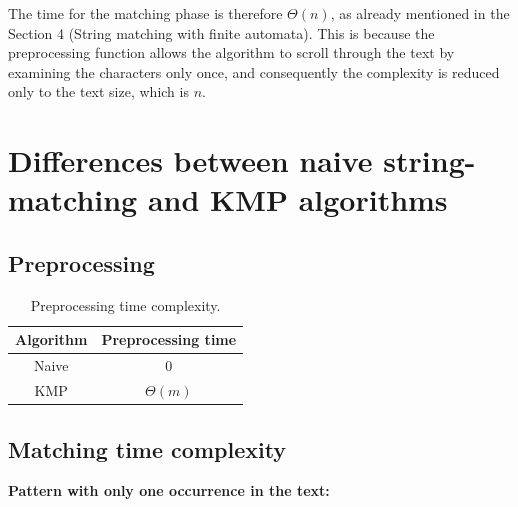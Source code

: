 \documentclass[11pt]{article}
\begin{document}
            The time for the matching phase is therefore $\Theta(n)$, as already mentioned in the Section 4 (String matching with finite automata).
            This is because the preprocessing function allows the algorithm to scroll through the text by examining the characters only once,
            and consequently the complexity is reduced only to the text size, which is $n$.

    \newpage

    \section{Differences between naive string-matching and KMP algorithms} \label{sec:naive_kmp_differences}

        \subsection{Preprocessing} \label{subsec:preprocessing}

            \begin{table}[H]
                \centering
                \begin{tabular}{|c|c|}
                    \hline
                    \textbf{Algorithm} & \textbf{Preprocessing time} \\
                    \hline
                    Naive & {$0$} \\
                    \hline
                    KMP & {$\Theta(m)$} \\
                    \hline
                    \end{tabular}
                \caption{Preprocessing time complexity.}
                \label{tab:preprocessing_time_complexity}
            \end{table}

        \subsection{Matching time complexity} \label{subsec:naive_kmp_time_complexity}

            \quad \textbf{Pattern with only one occurrence in the text:}
\end{document}
